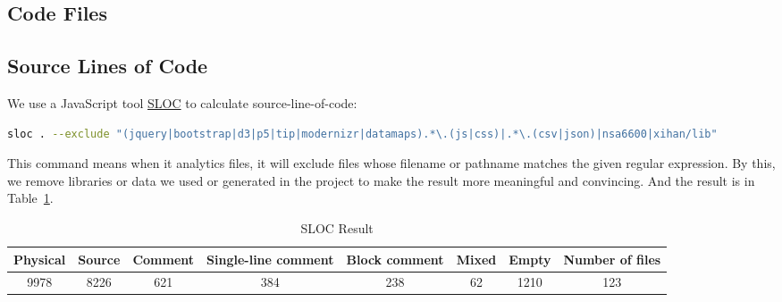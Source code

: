 \documentclass[paper=a4, fontsize=11pt]{report} %
\begin{document}
\subsection{Code Files} %
\label{sub:code_files}



\subsection{Source Lines of Code} %
\label{sub:sloc}

We use a JavaScript tool \href{https://github.com/flosse/sloc}{SLOC} to calculate source-line-of-code:

\begin{lstlisting}[language=bash, breaklines=true]
sloc . --exclude "(jquery|bootstrap|d3|p5|tip|modernizr|datamaps).*\.(js|css)|.*\.(csv|json)|nsa6600|xihan/lib"
\end{lstlisting}

This command means when it analytics files, it will exclude files whose filename or pathname matches the given regular expression.
By this, we remove libraries or data we used or generated in the project to make the result more meaningful and convincing.
And the result is in Table~\ref{tab:sloc}.

\begin{table}[H]
    \caption{SLOC Result}\label{tab:sloc}
    \begin{center}
        \begin{tabular}{cccccccc}
        \toprule
        \textbf{Physical} & \textbf{Source} & \textbf{Comment} & \textbf{Single-line comment} & \textbf{Block comment} & \textbf{Mixed} & \textbf{Empty} & \textbf{Number of files}\\
        \midrule
        9978     & 8226   & 621     & 384                 & 238           & 62    & 1210  & 123 \\
        \bottomrule
        \end{tabular}
    \end{center}
\end{table}
\end{document}
